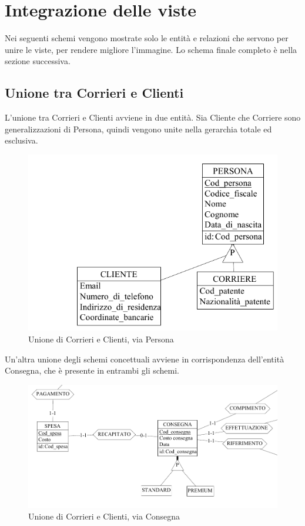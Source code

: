 \documentclass[a4paper,12pt]{report}
\begin{document}
\section{Integrazione delle viste}
Nei seguenti schemi vengono mostrate solo le entità e relazioni che servono per unire le viste, per rendere migliore l'immagine. Lo schema finale completo è nella sezione successiva.
\subsection{Unione tra Corrieri e Clienti}
L'unione tra Corrieri e Clienti avviene in due entità. Sia Cliente che Corriere sono generalizzazioni di Persona, quindi vengono unite nella gerarchia totale ed esclusiva.
\begin{figure}[h]
	\centering{}
	\includegraphics[width=\textwidth]{img/Unione-Clienti-Corrieri1.pdf}
	\caption{Unione di Corrieri e Clienti, via Persona}
\end{figure}
Un'altra unione degli schemi concettuali avviene in corrispondenza dell'entità Consegna, che è presente in entrambi gli schemi. 
\begin{figure}[h]
	\centering{}
	\includegraphics[width=\textwidth]{img/Unione-Clienti-Corrieri2.pdf}
	\caption{Unione di Corrieri e Clienti, via Consegna}
\end{figure}
\end{document}
